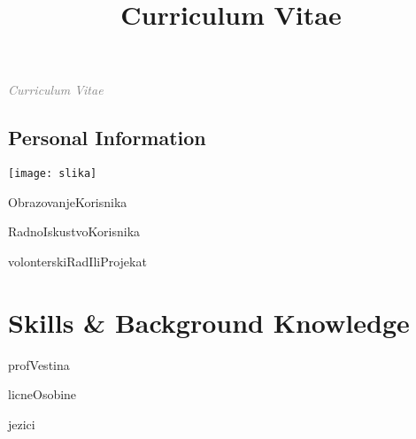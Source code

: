 \documentclass[11pt,a4paper,sans]{moderncv} %
\title{Curriculum Vitae}
\begin{document}
\textit{\Huge{\textcolor{gray}{Curriculum Vitae}}}

\hrulefill

\begin{multicols}{2}
  \section{Personal Information}
  \columnbreak
  \texttt{[image: slika]}
\end{multicols}


ObrazovanjeKorisnika

RadnoIskustvoKorisnika

volonterskiRadIliProjekat
\

\section{Skills \& Background Knowledge}

profVestina

licneOsobine


jezici

\end{document}
